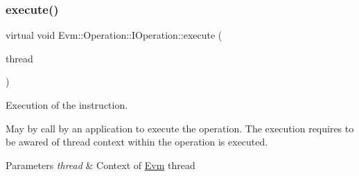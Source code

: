 \subsubsection{\texorpdfstring{execute()}{execute()}}
{\footnotesize\ttfamily virtual void Evm\+::\+Operation\+::\+I\+Operation\+::execute (\begin{DoxyParamCaption}\item[{\mbox{\hyperlink{struct_evm_1_1_thread_context}{Thread\+Context}} \&}]{thread }\end{DoxyParamCaption})\hspace{0.3cm}{\ttfamily [pure virtual]}}



Execution of the instruction. 

May by call by an application to execute the operation. The execution requires to be awared of thread context within the operation is executed. 
\begin{DoxyParams}{Parameters}
{\em thread} & Context of \mbox{\hyperlink{namespace_evm}{Evm}} thread \\
\hline
\end{DoxyParams}


